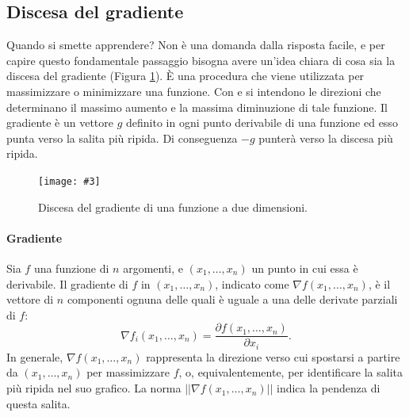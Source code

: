 \documentclass[12pt, twoside, letterpaper]{report}
\newcommand{\img}[4] {
	\begin{figure}
		\centering
		\texttt{[image: \#3]}\\
		\caption{#1}
		\label{fig:#4}
	\end{figure}
}
\begin{document}
			\subsection{Discesa del gradiente}
				Quando si smette apprendere? Non è una domanda dalla risposta facile, e per capire questo fondamentale passaggio bisogna avere un'idea chiara di cosa sia la discesa del gradiente (Figura \ref{fig:gradient_descent}). È una procedura che viene utilizzata per massimizzare o minimizzare una funzione. Con  e  si intendono le direzioni che determinano il massimo aumento e la massima diminuzione di tale funzione. Il gradiente è un vettore $g$ definito in ogni punto derivabile di una funzione ed esso punta verso la salita più ripida. Di conseguenza $-g$ punterà verso la discesa più ripida.
				
				\img{Discesa del gradiente di una funzione a due dimensioni. \cite{kriesel}}{0.5}{gradient_descent_2d.png}{gradient_descent}
				
				\paragraph{Gradiente} Sia $f$ una funzione di $n$ argomenti, e $(x_1, \dots, x_n)$ un punto in cui essa è derivabile. Il gradiente di $f$ in $(x_1, \dots, x_n)$, indicato come $\nabla f(x_1, \dots, x_n)$, è il vettore di $n$ componenti ognuna delle quali è uguale a una delle derivate parziali di $f$: 
					$$\nabla f_i(x_1, \dots, x_n) = \frac{\partial f(x_1, \dots, x_n)}{\partial x_i}.$$
					In generale, $\nabla f(x_1, \dots, x_n)$ rappresenta la direzione verso cui spostarsi a partire da $(x_1, \dots, x_n)$ per massimizzare $f$, o, equivalentemente, per identificare la salita più ripida nel suo grafico. La norma $||\nabla f(x_1, \dots, x_n)||$ indica la pendenza di questa salita.
					
\end{document}
